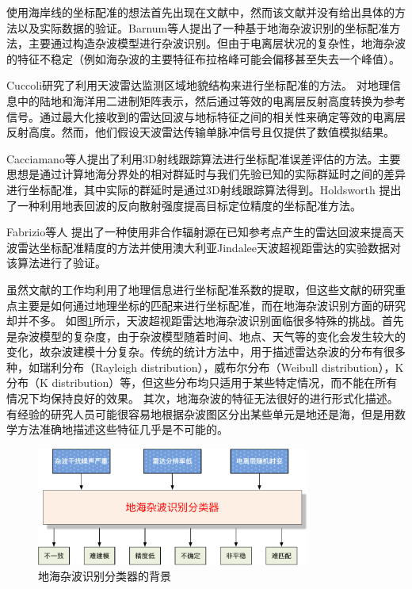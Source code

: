 使用海岸线的坐标配准的想法首先出现在文献\cite{wheadon1994ionospheric, anderson1995auto}中，然而该文献并没有给出具体的方法以及实际数据的验证。Barnum等人提出了一种基于地海杂波识别的坐标配准方法，主要通过构造杂波模型进行杂波识别。但由于电离层状况的复杂性，地海杂波的特征不稳定（例如海杂波的主要特征布拉格峰可能会偏移甚至失去一个峰值）。

Cuccoli研究了利用天波雷达监测区域地貌结构来进行坐标配准的方法。
对地理信息中的陆地和海洋用二进制矩阵表示，然后通过等效的电离层反射高度转换为参考信号。通过最大化接收到的雷达回波与地标特征之间的相关性来确定等效的电离层反射高度。然而，他们假设天波雷达传输单脉冲信号且仅提供了数值模拟结果。

Cacciamano等人提出了利用3D射线跟踪算法进行坐标配准误差评估的方法。主要思想是通过计算地海分界处的相对群延时与我们先验已知的实际群延时之间的差异进行坐标配准，其中实际的群延时是通过3D射线跟踪算法得到。Holdsworth 提出了一种利用地表回波的反向散射强度提高目标定位精度的坐标配准方法。

Fabrizio等人 提出了一种使用非合作辐射源在已知参考点产生的雷达回波来提高天波雷达坐标配准精度的方法并使用澳大利亚Jindalee天波超视距雷达的实验数据对该算法进行了验证。

虽然文献\cite{barnum1998over, weijers1995oth, fabrizio2016using, wheadon1994ionospheric, anderson1995auto, cuccoli2009over, cuccoli2009over2, cuccoli2010sea, cuccoli2011coordinate, cacciamano2012coordinate}的工作均利用了地理信息进行坐标配准系数的提取，但这些文献的研究重点主要是如何通过地理坐标的匹配来进行坐标配准，而在地海杂波识别方面的研究却并不多。
如图\ref{fig:clutterproblem}所示，天波超视距雷达地海杂波识别面临很多特殊的挑战。首先是杂波模型的复杂度，由于杂波模型随着时间、地点、天气等的变化会发生较大的变化，故杂波建模十分复杂。传统的统计方法中，用于描述雷达杂波的分布有很多种，如瑞利分布（Rayleigh distribution），威布尔分布（Weibull distribution），K分布（K distribution）等，但这些分布均只适用于某些特定情况，而不能在所有情况下均保持良好的效果。
其次，地海杂波的特征无法很好的进行形式化描述。有经验的研究人员可能很容易地根据杂波图区分出某些单元是地还是海，但是用数学方法准确地描述这些特征几乎是不可能的。
\begin{figure}[hbt]
	\centering
	\includegraphics[width=9cm]{figures/othr/othr_classification.pdf}
	\caption{地海杂波识别分类器的背景}
	\label{fig:clutterproblem}
\end{figure}

